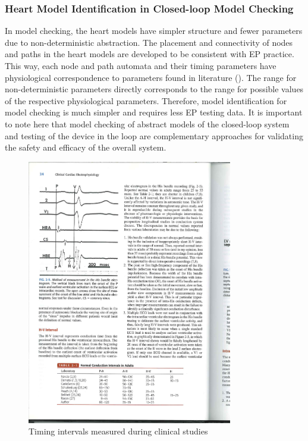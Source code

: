 \subsubsection{Heart Model Identification in Closed-loop Model Checking}
In model checking, the heart models have simpler structure and fewer parameters due to non-deterministic abstraction. The placement and connectivity of nodes and paths in the heart models are developed to be consistent with EP practice. This way, each node and path automata and their timing parameters have physiological correspondence to parameters found in literature (). The range for non-deterministic parameters directly corresponds to the range for possible values of the respective physiological parameters. Therefore, model identification for model checking is much simpler and requires less EP testing data. It is important to note here that model checking of abstract models of the closed-loop system and testing of the device in the loop are complementary approaches for validating the safety and efficacy of the overall system. 

\begin{figure}[!t]
\centering
		\includegraphics[width=0.8\textwidth]{figs/intervals.pdf}
		
\caption{\small Timing intervals measured during clinical studies \cite{josephson}}
\label{fig:intervals}
\end{figure} 



